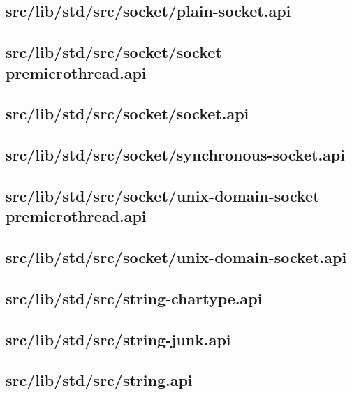 \subsection{src/lib/std/src/socket/plain-socket.api}


\subsection{src/lib/std/src/socket/socket--premicrothread.api}


\subsection{src/lib/std/src/socket/socket.api}


\subsection{src/lib/std/src/socket/synchronous-socket.api}


\subsection{src/lib/std/src/socket/unix-domain-socket--premicrothread.api}


\subsection{src/lib/std/src/socket/unix-domain-socket.api}


\subsection{src/lib/std/src/string-chartype.api}


\subsection{src/lib/std/src/string-junk.api}


\subsection{src/lib/std/src/string.api}


